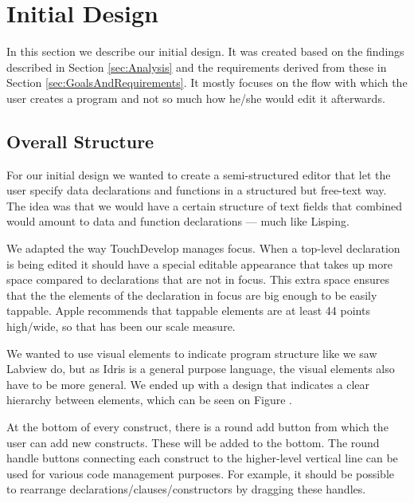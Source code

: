 \section{Initial Design}
\label{sec:InitialDesign}

In this section we describe our initial design. It was created based on the
findings described in Section \ref{sec:Analysis} and the requirements derived
from these in Section \ref{sec:GoalsAndRequirements}. It mostly focuses on the
flow with which the user creates a program and not so much how he/she would
edit it afterwards.

\subsection{Overall Structure}
For our initial design we wanted to create a semi-structured editor that let
the user specify data declarations and functions in a structured but free-text way. The idea was that we would have a certain structure of text fields that
combined would amount to data and function declarations --- much like Lisping.

We adapted the way TouchDevelop manages focus. When a top-level declaration is
being edited it should have a special editable appearance that takes up more
space compared to declarations that are not in focus. This extra space ensures
that the the elements of the declaration in focus are big enough to be easily
tappable. Apple recommends that tappable elements are at least 44 points high/wide, so that has been our scale measure.

We wanted to use visual elements to indicate program structure like we saw
Labview do, but as Idris is a general purpose language, the visual elements
also have to be more general. We ended up with a design that indicates a clear
hierarchy between elements, which can be seen on Figure .

\missingfigure{}

At the bottom of every construct, there is a round add button from which the user can add new constructs. These will be added to the bottom. The round handle buttons connecting each construct to the higher-level vertical line
can be used for various code management purposes. For example, it should be
possible to rearrange declarations/clauses/constructors by dragging these
handles. 

